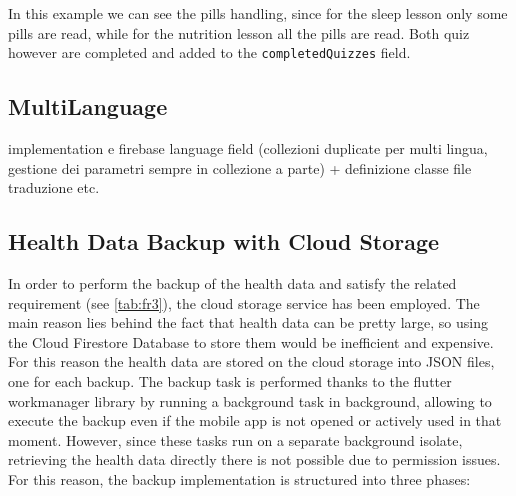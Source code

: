 \noindent In this example we can see the pills handling, since for the sleep lesson only some pills are read, while for the nutrition lesson all the pills are read. Both quiz however are completed and added to the \texttt{completedQuizzes} field.
\subsection{MultiLanguage}
implementation e firebase language field
(collezioni duplicate per multi lingua, gestione dei parametri sempre in collezione a parte) + definizione classe file traduzione etc.

\subsection{Health Data Backup with Cloud Storage}
In order to perform the backup of the health data and satisfy the related requirement (see \cref{tab:fr3}), the cloud storage service has been employed. The main reason lies behind the fact that health data can be pretty large, so using the Cloud Firestore Database to store them would be inefficient and expensive. For this reason the health data are stored on the cloud storage into JSON files, one for each backup. The backup task is performed thanks to the flutter workmanager library by running a background task in background, allowing to execute the backup even if the mobile app is not opened or actively used in that moment. However, since these tasks run on a separate background isolate, retrieving the health data directly there is not possible due to permission issues.
\noindent For this reason, the backup implementation is structured into three phases:
